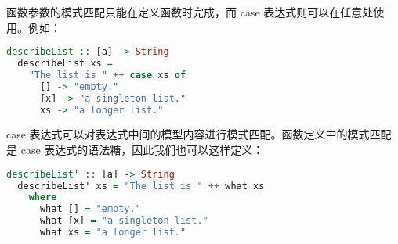\documentclass[./main.tex]{subfiles}
\begin{document}
函数参数的模式匹配只能在定义函数时完成，而 case 表达式则可以在任意处使用。例如：

\begin{lstlisting}[language=Haskell]
  describeList :: [a] -> String
  describeList xs =
    "The list is " ++ case xs of
      [] -> "empty."
      [x] -> "a singleton list."
      xs -> "a longer list."
\end{lstlisting}

case 表达式可以对表达式中间的模型内容进行模式匹配。函数定义中的模式匹配是 case 表达式的语法糖，因此我们也可以这样定义：

\begin{lstlisting}[language=Haskell]
  describeList' :: [a] -> String
  describeList' xs = "The list is " ++ what xs
    where
      what [] = "empty."
      what [x] = "a singleton list."
      what xs = "a longer list."
\end{lstlisting}
\end{document}
